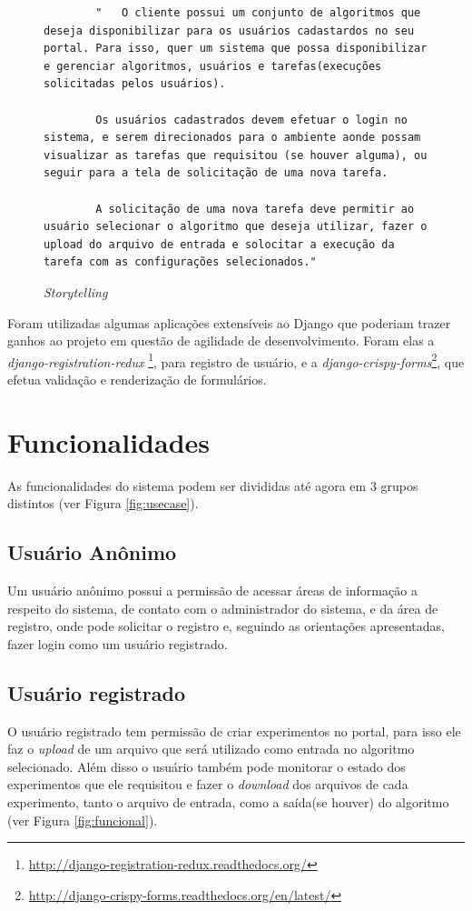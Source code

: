 \documentclass[tg]{mdtufsm}
\begin{document}
\begin{figure}
	\centering
	\begin{minipage}[t]{0.7\textwidth}
		\begin{lstlisting}		
		"   O cliente possui um conjunto de algoritmos que deseja disponibilizar para os usuários cadastardos no seu portal. Para isso, quer um sistema que possa disponibilizar e gerenciar algoritmos, usuários e tarefas(execuções solicitadas pelos usuários).
		
		Os usuários cadastrados devem efetuar o login no sistema, e serem direcionados para o ambiente aonde possam visualizar as tarefas que requisitou (se houver alguma), ou seguir para a tela de solicitação de uma nova tarefa.
		
		A solicitação de uma nova tarefa deve permitir ao usuário selecionar o algoritmo que deseja utilizar, fazer o upload do arquivo de entrada e solocitar a execução da tarefa com as configurações selecionados."
		\end{lstlisting}
	\end{minipage}
	\caption{\emph{Storytelling}}
	\label{fig:story}
\end{figure}



Foram utilizadas algumas aplicações extensíveis ao Django que poderiam trazer ganhos ao projeto em questão de agilidade de desenvolvimento. Foram elas a \emph{django-registration-redux} \footnote{\url{http://django-registration-redux.readthedocs.org/}}, para registro de usuário, e a \emph{django-crispy-forms}\footnote{\url{http://django-crispy-forms.readthedocs.org/en/latest/}}, que efetua validação e renderização de formulários.

\section{Funcionalidades}



As funcionalidades do sistema podem ser divididas até agora em 3 grupos distintos (ver Figura \ref{fig:usecase}).
\subsection{Usuário Anônimo}
Um usuário anônimo possui a permissão de acessar áreas de informação a respeito do sistema, de contato com o administrador do sistema, e da área de registro, onde pode solicitar o registro e, seguindo as orientações apresentadas, fazer login como um usuário registrado.
\subsection{Usuário registrado}
O usuário registrado tem permissão de criar experimentos no portal, para isso ele faz o \emph{upload} de um arquivo que será utilizado como entrada no algoritmo selecionado. Além disso o usuário também pode monitorar o estado dos experimentos que ele requisitou e fazer o \emph{download} dos arquivos de cada experimento, tanto o arquivo de entrada, como a saída(se houver) do algoritmo (ver Figura \ref{fig:funcional}).
\end{document}
